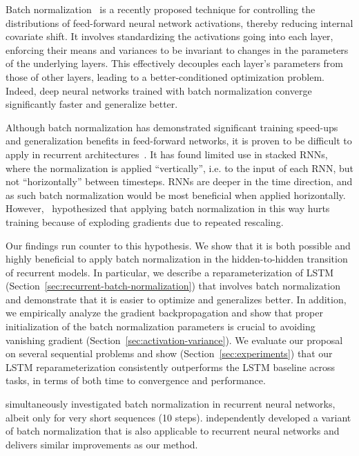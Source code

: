 \documentclass{article} \pdfoutput=1 \usepackage[utf8]{inputenc}
\begin{document}
Batch normalization~\citep{batchnorm} is a recently proposed technique for controlling the
distributions of feed-forward neural network activations, thereby reducing internal covariate
shift.  It involves standardizing the activations going into each layer, enforcing their means and
variances to be invariant to changes in the parameters of the underlying layers.
This effectively decouples each layer's parameters from those of other layers, leading to a
better-conditioned optimization problem.  Indeed, deep neural networks trained with batch
normalization converge significantly faster and generalize better.

Although batch normalization has demonstrated significant training speed-ups and generalization
benefits in feed-forward networks, it is proven to be difficult to apply in recurrent
architectures~\citep{cesar,baidu}.  It has found limited use in stacked RNNs, where the
normalization is applied ``vertically'', i.e. to the input of each RNN, but not ``horizontally''
between timesteps.  RNNs are deeper in the time direction, and as such batch normalization would
be most beneficial when applied horizontally.  However,~\citet{cesar} hypothesized that applying
batch normalization in this way hurts training because of exploding gradients due to repeated
rescaling.

Our findings run counter to this hypothesis.  We show that it is both possible and highly
beneficial to apply batch normalization in the hidden-to-hidden transition of recurrent models.
In particular, we describe a reparameterization of LSTM
(Section~\ref{sec:recurrent-batch-normalization}) that involves batch normalization and
demonstrate that it is easier to optimize and generalizes better.  In addition, we empirically
analyze the gradient backpropagation and show that proper initialization of the batch
normalization parameters is crucial to avoiding vanishing gradient
(Section~\ref{sec:activation-variance}).  We evaluate our proposal on several sequential problems
and show (Section~\ref{sec:experiments}) that our LSTM reparameterization consistently outperforms
the LSTM baseline across tasks, in terms of both time to convergence and performance.


\citet{liao2016bridging} simultaneously investigated batch normalization in recurrent neural networks,
albeit only for very short sequences (10 steps).
\citet{ba2016layer} independently developed a variant of batch normalization that is
also applicable to recurrent neural networks and delivers similar improvements as 
our method.
\end{document}
